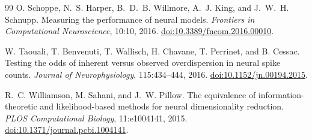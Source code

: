 \documentclass[11pt]{article}
\begin{document}
\begin{thebibliography}{99}
O. Schoppe, N.~S. Harper, B.~D.~B. Willmore, A.~J. King, and J.~W.~H. Schnupp.
Measuring the performance of neural models.
\emph{Frontiers in Computational Neuroscience}, 10:10, 2016.
\href{https://doi.org/10.3389/fncom.2016.00010}{doi:10.3389/fncom.2016.00010}.

W. Taouali, T. Benvenuti, T. Wallisch, H. Chavane, T. Perrinet, and B. Cessac.
Testing the odds of inherent versus observed overdispersion in neural spike counts.
\emph{Journal of Neurophysiology}, 115:434--444, 2016.
\href{https://doi.org/10.1152/jn.00194.2015}{doi:10.1152/jn.00194.2015}.

R.~C. Williamson, M. Sahani, and J.~W. Pillow.
The equivalence of information-theoretic and likelihood-based methods for neural dimensionality reduction.
\emph{PLOS Computational Biology}, 11:e1004141, 2015.
\href{https://doi.org/10.1371/journal.pcbi.1004141}{doi:10.1371/journal.pcbi.1004141}.

\end{thebibliography}
\end{document}
